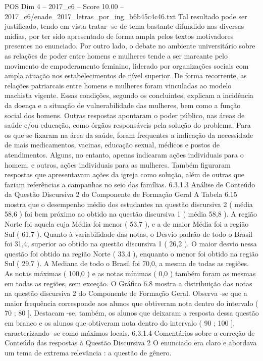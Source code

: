 \begin{textsample}{POS Dim 4 – 2017\_c6 – Score 10.00 – 2017\_c6/enade\_2017\_letras\_por\_ing\_b6b45c4c46.txt}
Tal resultado pode ser justificado, tendo em vista tratar -se de tema bastante difundido nas diversas mídias, por ter sido apresentado de forma ampla pelos textos motivadores presentes no enunciado.
Por outro lado, o debate no ambiente universitário sobre as relações de poder entre homens e mulheres tende a ser marcante pelo movimento de empoderamento feminino, liderado por organizações sociais com ampla atuação nos estabelecimentos de nível superior.
De forma recorrente, as relações patriarcais entre homens e mulheres foram vinculadas ao modelo machista vigente.
Essas condições, segundo os concluintes, explicam a incidência da doença e a situação de vulnerabilidade das mulheres, bem como a função social dos homens.
Outras respostas apontaram o poder público, nas áreas de saúde e/ou educação, como órgãos responsáveis pela solução do problema.
Para os que se fixaram na área da saúde, foram frequentes a indicação da necessidade de mais medicamentos, vacinas, educação sexual, médicos e postos de atendimentos.
Alguns, no entanto, apenas indicaram ações individuais para o homem, e outros, ações individuais para as mulheres.
Também figuraram respostas que apresentavam ações da igreja como solução, além de outras que faziam referências a campanhas no seio das famílias. 6.3.1.3 Análise de Conteúdo da Questão Discursiva 2 do Componente de Formação Geral A Tabela 6.15 mostra que o desempenho médio dos estudantes na questão discursiva 2 ( média 58,6 ) foi bem próximo ao obtido na questão discursiva 1 ( média 58,8 ).
A região Norte foi aquela cuja Média foi menor ( 53,7 ), e a de maior Média foi a região Sul ( 61,7 ).
Quanto à variabilidade das notas, o Desvio padrão de todo o Brasil foi 31,4, superior ao obtido na questão discursiva 1 ( 26,2 ).
O maior desvio nessa questão foi obtido na região Norte ( 33,4 ), enquanto o menor foi obtido na região Sul ( 29,7 ).
A Mediana de todo o Brasil foi 70,0, a mesma de todas as regiões.
As notas máximas ( 100,0 ) e as notas mínimas ( 0,0 ) também foram as mesmas em todas as regiões, sem exceção.
O Gráfico 6.8 mostra a distribuição das notas na questão discursiva 2 do Componente de Formação Geral.
Observa -se que a maior frequência corresponde aos alunos que obtiveram nota dentro do intervalo ( 70 ; 80 ].
Destacam -se, também, os alunos que deixaram a resposta dessa questão em branco e os alunos que obtiveram nota dentro do intervalo ( 90 ; 100 ], caracterizando -se como máximos locais. 6.3.1.4 Comentários sobre a correção de Conteúdo das respostas à Questão Discursiva 2 O enunciado era claro e abordava um tema de extrema relevância : a questão de gênero.

\end{textsample}

